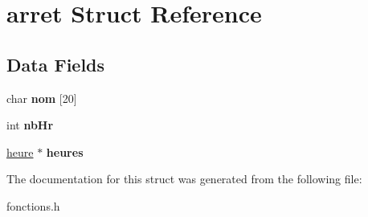 \hypertarget{structarret}{}\section{arret Struct Reference}
\label{structarret}
\subsection*{Data Fields}
\begin{DoxyCompactItemize}
\item 
\mbox{\label{structarret_aadad624255828e83c18a11df31c8f559}} 
char {\bfseries nom} \mbox{[}20\mbox{]}
\item 
\mbox{\label{structarret_a6b4020022196bf0b6046febc24a57797}} 
int {\bfseries nb\+Hr}
\item 
\mbox{\label{structarret_a01ecfeb7a82eb953a3241a26f0cec39e}} 
\hyperlink{structheure}{heure} $\ast$ {\bfseries heures}
\end{DoxyCompactItemize}


The documentation for this struct was generated from the following file\+:\begin{DoxyCompactItemize}
\item 
fonctions.\+h\end{DoxyCompactItemize}
